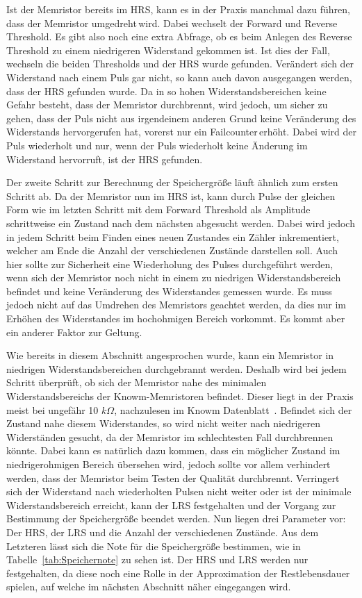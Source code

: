 Ist der Memristor bereits im HRS, kann es in der Praxis manchmal dazu führen, dass der Memristor \glqq umgedreht\grqq\,wird. Dabei wechselt der Forward und Reverse Threshold. Es gibt also noch eine extra Abfrage, ob es beim Anlegen des Reverse Threshold zu einem niedrigeren Widerstand gekommen ist. Ist dies der Fall, wechseln die beiden Thresholds und der HRS wurde gefunden. Verändert sich der Widerstand nach einem Puls gar nicht, so kann auch davon ausgegangen werden, dass der HRS gefunden wurde. Da in so hohen Widerstandsbereichen keine Gefahr besteht, dass der Memristor durchbrennt, wird jedoch, um sicher zu gehen, dass der Puls nicht aus irgendeinem anderen Grund keine Veränderung des Widerstands hervorgerufen hat, vorerst nur ein \glqq Failcounter\grqq\,erhöht. Dabei wird der Puls wiederholt und nur, wenn der Puls wiederholt keine Änderung im Widerstand hervorruft, ist der HRS gefunden.

Der zweite Schritt zur Berechnung der Speichergröße läuft ähnlich zum ersten Schritt ab. Da der Memristor nun im HRS ist, kann durch Pulse der gleichen Form wie im letzten Schritt mit dem Forward Threshold als Amplitude schrittweise ein Zustand nach dem nächsten abgesucht werden. Dabei wird jedoch in jedem Schritt beim Finden eines neuen Zustandes ein Zähler inkrementiert, welcher am Ende die Anzahl der verschiedenen Zustände darstellen soll. Auch hier sollte zur Sicherheit eine Wiederholung des Pulses durchgeführt werden, wenn sich der Memristor noch nicht in einem zu niedrigen Widerstandsbereich befindet und keine Veränderung des Widerstandes gemessen wurde. Es muss jedoch nicht auf das Umdrehen des Memristors geachtet werden, da dies nur im Erhöhen des Widerstandes im hochohmigen Bereich vorkommt. Es kommt aber ein anderer Faktor zur Geltung.

Wie bereits in diesem Abschnitt angesprochen wurde, kann ein Memristor in niedrigen Widerstandsbereichen durchgebrannt werden. Deshalb wird bei jedem Schritt überprüft, ob sich der Memristor nahe des minimalen Widerstandsbereichs der Knowm-Memristoren befindet. Dieser liegt in der Praxis meist bei ungefähr 10 $k\Omega$, nachzulesen im Knowm Datenblatt~\cite{knowm_comp_2019}. Befindet sich der Zustand nahe diesem Widerstandes, so wird nicht weiter nach niedrigeren Widerständen gesucht, da der Memristor im schlechtesten Fall durchbrennen könnte. Dabei kann es natürlich dazu kommen, dass ein möglicher Zustand im niedrigerohmigen Bereich übersehen wird, jedoch sollte vor allem verhindert werden, dass der Memristor beim Testen der Qualität durchbrennt. Verringert sich der Widerstand nach wiederholten Pulsen nicht weiter oder ist der minimale Widerstandsbereich erreicht, kann der LRS festgehalten und der Vorgang zur Bestimmung der Speichergröße beendet werden. Nun liegen drei Parameter vor: Der HRS, der LRS und die Anzahl der verschiedenen Zustände. Aus dem Letzteren lässt sich die Note für die Speichergröße bestimmen, wie in Tabelle~\ref{tab:Speichernote} zu sehen ist. Der HRS und LRS werden nur festgehalten, da diese noch eine Rolle in der Approximation der Restlebensdauer spielen, auf welche im nächsten Abschnitt näher eingegangen wird.

